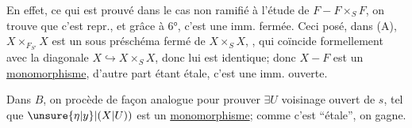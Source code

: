 En effet,  ce qui est prouvé dans le cas non ramifié à l'étude de $F\mathbin{-}F\times_S F$, on trouve que c'est repr., et grâce à 6°, c'est une imm. fermée. Ceci posé, dans (A), $X\times_{F_{S'}}X$ est un sous préschéma fermé de $X\times_S X$, , qui coïncide formellement avec la diagonale $X\hookrightarrow X\times_S X$, donc lui est identique; donc $X\mathbin{-}F$ est un \uline{monomorphisme}, d'autre part étant étale, c'est une imm. ouverte.

Dans $B$, on procède de façon analogue pour prouver $\exists U$ voisinage ouvert de $s$, tel que $\unsure{\eta|y}|(X|U))$ est un \uline{monomorphisme}; comme c'est   ``étale'', on gagne.
